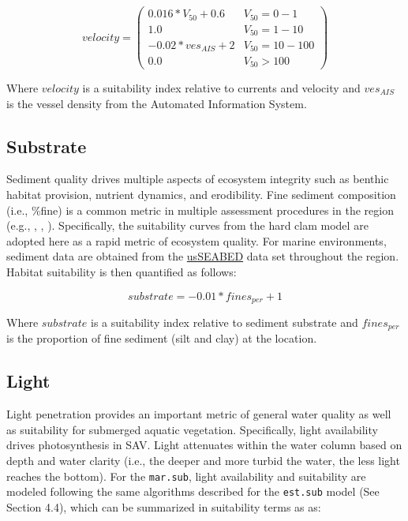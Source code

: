 \documentclass[
]{book}
\begin{document}
\[velocity = \begin{pmatrix} 0.016*V_{50}+0.6 & V_{50}=0-1\\
1.0 & V_{50}=1-10\\
-0.02*ves_{AIS}+2 & V_{50}=10-100\\
0.0 & V_{50}>100
\end{pmatrix}\]

Where \(velocity\) is a suitability index relative to currents and velocity and \(ves_{AIS}\) is the vessel density from the Automated Information System.

\hypertarget{substrate}{%
\subsection{Substrate}\label{substrate}}

Sediment quality drives multiple aspects of ecosystem integrity such as benthic habitat provision, nutrient dynamics, and erodibility. Fine sediment composition (i.e., \%fine) is a common metric in multiple assessment procedures in the region (e.g., \citet{mulholland_habitat_1984-1}, \citet{usace_new_2000}, \citet{USACE_port_2021}). Specifically, the suitability curves from the hard clam model \citep{mulholland_habitat_1984-1} are adopted here as a rapid metric of ecosystem quality. For marine environments, sediment data are obtained from the \href{https://www.usgs.gov/programs/cmhrp/science/accessing-usseabed}{usSEABED} data set throughout the region. Habitat suitability is then quantified as follows:

\[substrate = -0.01*fines_{per}+1\]

Where \(substrate\) is a suitability index relative to sediment substrate and \(fines_{per}\) is the proportion of fine sediment (silt and clay) at the location.

\hypertarget{light}{%
\subsection{Light}\label{light}}

Light penetration provides an important metric of general water quality as well as suitability for submerged aquatic vegetation. Specifically, light availability drives photosynthesis in SAV. Light attenuates within the water column based on depth and water clarity (i.e., the deeper and more turbid the water, the less light reaches the bottom). For the \texttt{mar.sub}, light availability and suitability are modeled following the same algorithms described for the \texttt{est.sub} model (See Section 4.4), which can be summarized in suitability terms as as:
\end{document}
